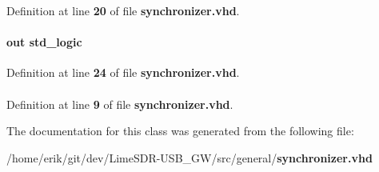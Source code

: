 Definition at line {\bf 20} of file {\bf synchronizer.\+vhd}.

\paragraph[{signal\+\_\+sinch}]{ {\bfseries \textcolor{keywordflow}{out}\textcolor{vhdlchar}{ }} {\bfseries \textcolor{comment}{std\+\_\+logic}\textcolor{vhdlchar}{ }} \hspace{0.3cm}{\ttfamily [Port]}}\label{classsynchronizer_aa2a120bee014aaa169dd8fead9aa7b69}


Definition at line {\bf 24} of file {\bf synchronizer.\+vhd}.

\paragraph[{std\+\_\+logic\+\_\+1164}]{\hspace{0.3cm}{\ttfamily [Package]}}\label{classsynchronizer_acd03516902501cd1c7296a98e22c6fcb}


Definition at line {\bf 9} of file {\bf synchronizer.\+vhd}.



The documentation for this class was generated from the following file\+:\begin{DoxyCompactItemize}
\item 
/home/erik/git/dev/\+Lime\+S\+D\+R-\/\+U\+S\+B\+\_\+\+G\+W/src/general/{\bf synchronizer.\+vhd}\end{DoxyCompactItemize}

